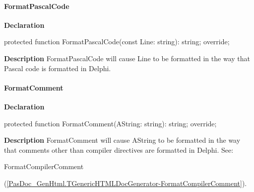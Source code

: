 \documentclass{report}
\newif\ifpdf
\begin{document}
\paragraph*{FormatPascalCode}\hspace*{\fill}

\label{PasDoc_GenHtml.TGenericHTMLDocGenerator-FormatPascalCode}
\begin{list}{}{
\setlength{\itemindent}{0cm}
\setlength{\listparindent}{0cm}
\setlength{\leftmargin}{\evensidemargin}
\addtolength{\leftmargin}{\tmplength}
\settowidth{\labelsep}{X}
\addtolength{\leftmargin}{\labelsep}
\setlength{\labelwidth}{\tmplength}
}
\item[\textbf{Declaration}\hfill]
\ifpdf
\begin{flushleft}
\fi
\begin{ttfamily}
protected function FormatPascalCode(const Line: string): string; override;\end{ttfamily}

\ifpdf
\end{flushleft}
\fi

\par
\item[\textbf{Description}]
FormatPascalCode will cause Line to be formatted in the way that Pascal code is formatted in Delphi.

\end{list}
\paragraph*{FormatComment}\hspace*{\fill}

\label{PasDoc_GenHtml.TGenericHTMLDocGenerator-FormatComment}
\begin{list}{}{
\setlength{\itemindent}{0cm}
\setlength{\listparindent}{0cm}
\setlength{\leftmargin}{\evensidemargin}
\addtolength{\leftmargin}{\tmplength}
\settowidth{\labelsep}{X}
\addtolength{\leftmargin}{\labelsep}
\setlength{\labelwidth}{\tmplength}
}
\item[\textbf{Declaration}\hfill]
\ifpdf
\begin{flushleft}
\fi
\begin{ttfamily}
protected function FormatComment(AString: string): string; override;\end{ttfamily}

\ifpdf
\end{flushleft}
\fi

\par
\item[\textbf{Description}]
FormatComment will cause AString to be formatted in the way that comments other than compiler directives are formatted in Delphi. See: \begin{ttfamily}FormatCompilerComment\end{ttfamily}(\ref{PasDoc_GenHtml.TGenericHTMLDocGenerator-FormatCompilerComment}).

\end{list}
\end{document}
